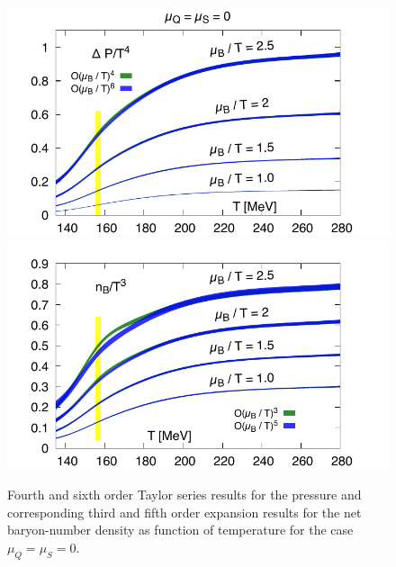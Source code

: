\documentclass[pdflatex,prd,twocolumn,showpacs,superscriptaddress,nofootinbib]{revtex4-1}
\begin{document}
\begin{figure}[t]
\includegraphics[scale=0.6]{fig/Temp_BQS000_muB_Order_test.pdf}
\includegraphics[scale=0.6]{fig/Temp_BQS100_muB_Order_test.pdf}
\caption{Fourth and sixth order Taylor series results for the pressure and corresponding third and fifth order expansion results for the net baryon-number density as function of temperature 
for the case $\mu_Q=\mu_S=0$.}
\label{fig:mudep2}
\end{figure}
\end{document}

